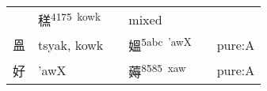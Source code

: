 \documentclass[14pt,a4paper]{scrartcl}
\begin{document}
\begin{longtable}[c]{@{}llllll@{}}
\begin{minipage}[t]{0.14\columnwidth}
\strut\end{minipage} &
\begin{minipage}[t]{0.14\columnwidth}\raggedright\strut
䅵\textsuperscript{4175~kowk}
\strut\end{minipage} &
\begin{minipage}[t]{0.14\columnwidth}\raggedright\strut
\strut\end{minipage} &
\begin{minipage}[t]{0.14\columnwidth}\raggedright\strut
mixed
\strut\end{minipage}\tabularnewline
\begin{minipage}[t]{0.14\columnwidth}\raggedright\strut
𥁕
\strut\end{minipage} &
\begin{minipage}[t]{0.14\columnwidth}\raggedright\strut
tsyak, kowk
\strut\end{minipage} &
\begin{minipage}[t]{0.14\columnwidth}\raggedright\strut
\strut\end{minipage} &
\begin{minipage}[t]{0.14\columnwidth}\raggedright\strut
媼\textsuperscript{5abc~'awX}
\strut\end{minipage} &
\begin{minipage}[t]{0.14\columnwidth}\raggedright\strut
\strut\end{minipage} &
\begin{minipage}[t]{0.14\columnwidth}\raggedright\strut
pure:A
\strut\end{minipage}\tabularnewline
\begin{minipage}[t]{0.14\columnwidth}\raggedright\strut
好
\strut\end{minipage} &
\begin{minipage}[t]{0.14\columnwidth}\raggedright\strut
'awX
\strut\end{minipage} &
\begin{minipage}[t]{0.14\columnwidth}\raggedright\strut
\strut\end{minipage} &
\begin{minipage}[t]{0.14\columnwidth}\raggedright\strut
薅\textsuperscript{8585~xaw}
\strut\end{minipage} &
\begin{minipage}[t]{0.14\columnwidth}\raggedright\strut
\strut\end{minipage} &
\begin{minipage}[t]{0.14\columnwidth}\raggedright\strut
pure:A
\strut\end{minipage}\tabularnewline

\end{longtable}
\end{document}
